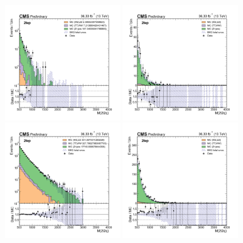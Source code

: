 \begin{figure}[htbp]
    \centering
    \includegraphics[width=0.45\textwidth]{figures/HighMassSearches/dataMCPlots/mass2l2jet_CR_2lep_btag.png}
    \includegraphics[width=0.45\textwidth]{figures/HighMassSearches/dataMCPlots/mass2lj_CR_2lep_btag.png}\\
    \includegraphics[width=0.45\textwidth]{figures/HighMassSearches/dataMCPlots/mass2l2jet_CR_2lep_untag.png}
    \includegraphics[width=0.45\textwidth]{figures/HighMassSearches/dataMCPlots/mass2lj_CR_2lep_untag.png}

\end{figure}
